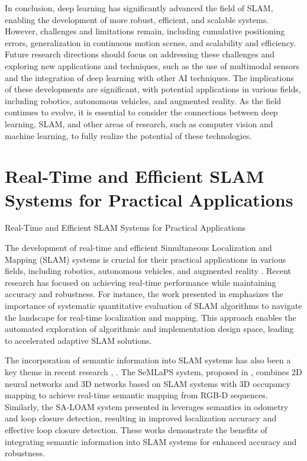\documentclass[conference]{IEEEtran}
\begin{document}
In conclusion, deep learning has significantly advanced the field of SLAM, enabling the development of more robust, efficient, and scalable systems. However, challenges and limitations remain, including cumulative positioning errors, generalization in continuous motion scenes, and scalability and efficiency. Future research directions should focus on addressing these challenges and exploring new applications and techniques, such as the use of multimodal sensors and the integration of deep learning with other AI techniques. The implications of these developments are significant, with potential applications in various fields, including robotics, autonomous vehicles, and augmented reality. As the field continues to evolve, it is essential to consider the connections between deep learning, SLAM, and other areas of research, such as computer vision and machine learning, to fully realize the potential of these technologies.

\section{Real-Time and Efficient SLAM Systems for Practical Applications}
Real-Time and Efficient SLAM Systems for Practical Applications

The development of real-time and efficient Simultaneous Localization and Mapping (SLAM) systems is crucial for their practical applications in various fields, including robotics, autonomous vehicles, and augmented reality \cite{b1}. Recent research has focused on achieving real-time performance while maintaining accuracy and robustness. For instance, the work presented in \cite{b2} emphasizes the importance of systematic quantitative evaluation of SLAM algorithms to navigate the landscape for real-time localization and mapping. This approach enables the automated exploration of algorithmic and implementation design space, leading to accelerated adaptive SLAM solutions.

The incorporation of semantic information into SLAM systems has also been a key theme in recent research \cite{b3}, \cite{b4}. The SeMLaPS system, proposed in \cite{b3}, combines 2D neural networks and 3D networks based on SLAM systems with 3D occupancy mapping to achieve real-time semantic mapping from RGB-D sequences. Similarly, the SA-LOAM system presented in \cite{b4} leverages semantics in odometry and loop closure detection, resulting in improved localization accuracy and effective loop closure detection. These works demonstrate the benefits of integrating semantic information into SLAM systems for enhanced accuracy and robustness.
\end{document}
